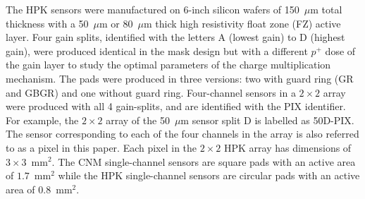 \documentclass[preprint,1p]{elsarticle}
\begin{document}
The HPK sensors were manufactured on 6-inch silicon wafers of 150~$\mu$m total
thickness with a 50~$\mu$m or 80~$\mu$m thick high resistivity float zone (FZ)
active layer. Four gain splits, identified with the letters A (lowest gain) to D
(highest gain), were produced identical in the mask design but with a different
$p^+$ dose of the gain layer to study the optimal parameters of the charge
multiplication mechanism. The pads were produced in three versions: two with
guard ring (GR and GBGR) and one without guard ring. Four-channel sensors in a $2\times 2$
array were produced with all 4 gain-splits, and are identified with the PIX
identifier. For example, the $2\times 2$ array of the 50~$\mu$m sensor split D is labelled as
50D-PIX. The sensor corresponding to each of the four channels in the array 
is also referred to as a pixel in this paper. 
Each pixel in the $2\times 2$ HPK array has dimensions of $3\times 3$~$\mathrm{mm}^{2}$. 
The CNM single-channel sensors are square pads with an active area of $1.7$~$\mathrm{mm}^{2}$ 
while the HPK single-channel sensors are circular pads with an active area of $0.8$~$\mathrm{mm}^{2}$.
\end{document}
